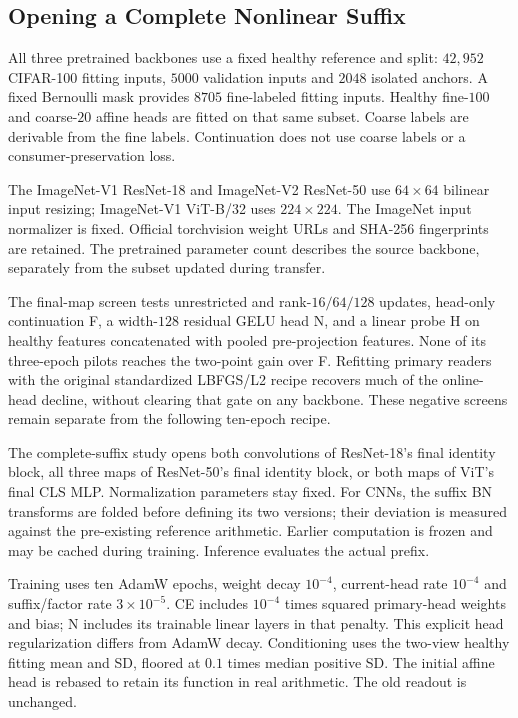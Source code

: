 \subsection{Opening a Complete Nonlinear Suffix}\label{app:nonlinear_suffix}

All three pretrained backbones use a fixed healthy reference and split:
$42{,}952$ CIFAR-100 fitting inputs, $5000$ validation inputs and $2048$
isolated anchors. A fixed Bernoulli mask provides $8705$ fine-labeled
fitting inputs. Healthy fine-$100$ and coarse-$20$ affine heads are fitted
on that same subset. Coarse labels are derivable from the fine labels. Continuation does not use
coarse labels or a consumer-preservation loss.

The ImageNet-V1 ResNet-18 and ImageNet-V2 ResNet-50 use $64\times64$
bilinear input resizing; ImageNet-V1 ViT-B/32 uses $224\times224$. The
ImageNet input normalizer is fixed. Official torchvision weight URLs and
SHA-256 fingerprints are retained. The pretrained parameter count describes
the source backbone, separately from the subset updated during transfer.

The final-map screen tests unrestricted and rank-$16/64/128$ updates,
head-only continuation F, a width-$128$ residual GELU head N, and a linear
probe H on healthy features concatenated with pooled pre-projection
features. None of its three-epoch pilots reaches the two-point gain over F.
Refitting primary readers with the original standardized LBFGS/L2 recipe
recovers much of the online-head decline, without clearing that gate on
any backbone. These negative screens remain separate from the following
ten-epoch recipe.

The complete-suffix study opens both convolutions of ResNet-18's final
identity block, all three maps of ResNet-50's final identity block, or both
maps of ViT's final CLS MLP. Normalization parameters stay fixed. For CNNs,
the suffix BN transforms are folded before defining its two versions;
their deviation is measured against the pre-existing reference arithmetic.
Earlier computation is frozen and may be cached during training. Inference
evaluates the actual prefix.

Training uses ten AdamW epochs, weight decay $10^{-4}$, current-head rate
$10^{-4}$ and suffix/factor rate $3\times10^{-5}$. CE includes $10^{-4}$
times squared primary-head weights and bias; N includes its trainable
linear layers in that penalty. This explicit head regularization differs
from AdamW decay. Conditioning uses the two-view healthy fitting mean and
SD, floored at $0.1$ times median positive SD. The initial affine head is
rebased to retain its function in real arithmetic. The old readout is unchanged.

